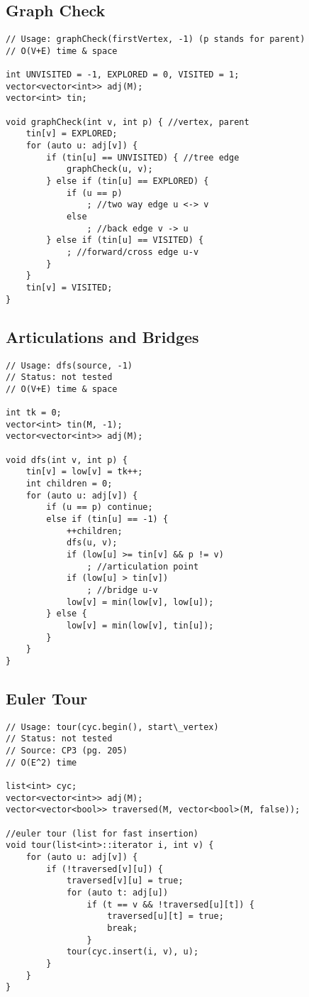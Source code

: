 \documentclass[12pt, a4paper, twoside]{article}
\begin{document}
\subsection{Graph Check}
\begin{lstlisting}
// Usage: graphCheck(firstVertex, -1) (p stands for parent)
// O(V+E) time & space

int UNVISITED = -1, EXPLORED = 0, VISITED = 1;
vector<vector<int>> adj(M);
vector<int> tin;

void graphCheck(int v, int p) { //vertex, parent
	tin[v] = EXPLORED;
	for (auto u: adj[v]) {
		if (tin[u] == UNVISITED) { //tree edge
			graphCheck(u, v);
		} else if (tin[u] == EXPLORED) {
			if (u == p)
				; //two way edge u <-> v
			else
				; //back edge v -> u
		} else if (tin[u] == VISITED) {
			; //forward/cross edge u-v
		}
	}
	tin[v] = VISITED;
}
\end{lstlisting}

\subsection{Articulations and Bridges}
\begin{lstlisting}
// Usage: dfs(source, -1)
// Status: not tested
// O(V+E) time & space

int tk = 0;
vector<int> tin(M, -1);
vector<vector<int>> adj(M);

void dfs(int v, int p) {
	tin[v] = low[v] = tk++;
	int children = 0;
	for (auto u: adj[v]) {
		if (u == p) continue;
		else if	(tin[u] == -1) {
			++children;
			dfs(u, v);
			if (low[u] >= tin[v] && p != v)
				; //articulation point
			if (low[u] > tin[v])
				; //bridge u-v
			low[v] = min(low[v], low[u]);
		} else {
			low[v] = min(low[v], tin[u]);
		}
	}
}
\end{lstlisting}

\subsection{Euler Tour}
\begin{lstlisting}
// Usage: tour(cyc.begin(), start\_vertex)
// Status: not tested
// Source: CP3 (pg. 205)
// O(E^2) time

list<int> cyc;
vector<vector<int>> adj(M);
vector<vector<bool>> traversed(M, vector<bool>(M, false));

//euler tour (list for fast insertion)
void tour(list<int>::iterator i, int v) {
	for (auto u: adj[v]) {
		if (!traversed[v][u]) {
			traversed[v][u] = true;
			for (auto t: adj[u])
				if (t == v && !traversed[u][t]) {
					traversed[u][t] = true;
					break;
				}
			tour(cyc.insert(i, v), u);
		}
	}
}
\end{lstlisting}
\end{document}
